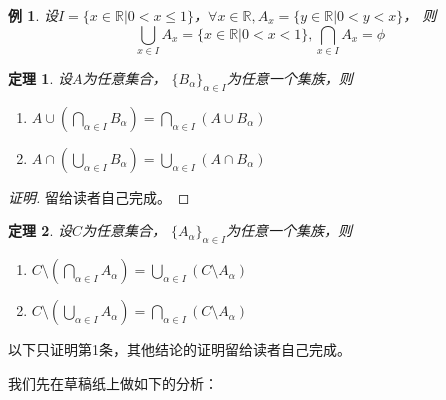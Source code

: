 \documentclass{book}[oneside]
\newtheorem{Thm}{定理}[chapter]
\newtheorem*{Example}{例}
\begin{document}
\begin{CJK*}{UTF8}{gbsn}
  \begin{Example}
    设$I=\{x \in \mathbb{R} | 0 < x \leq 1\}$，$\forall x \in \mathbb{R}, A_x=\{y\in \mathbb{R}|0 < y < x\}$，
    则
    \begin{equation*}
      \bigcup_{x\in I}A_x=\{x \in \mathbb{R} | 0 < x < 1\},
      \bigcap_{x\in I}A_x=\phi      
    \end{equation*}
  \end{Example}

  \begin{Thm}
设$A$为任意集合， $\{B_{\alpha}\}_{\alpha \in I}$为任意一个集族，则
\begin{enumerate}
  \item $A \cup (\bigcap_{\alpha \in I}B_{\alpha}) = \bigcap_{\alpha \in I}(A \cup B_{\alpha})$
  \item $A \cap (\bigcup_{\alpha \in I}B_{\alpha}) = \bigcup_{\alpha \in I}(A \cap B_{\alpha})$
\end{enumerate}
\end{Thm}
\begin{proof}[证明]
  留给读者自己完成。
\end{proof}
\begin{Thm}
  设$C$为任意集合， $\{A_{\alpha}\}_{\alpha \in I}$为任意一个集族，则
  \begin{enumerate}
  \item $C\setminus(\bigcap_{\alpha \in I}A_{\alpha})=\bigcup_{\alpha\in I}(C\setminus A_{\alpha})$
  \item $C\setminus(\bigcup_{\alpha \in I}A_{\alpha})=\bigcap_{\alpha\in I}(C\setminus A_{\alpha})$
  \end{enumerate}
  \end{Thm}
  以下只证明第1条，其他结论的证明留给读者自己完成。

  我们先在草稿纸上做如下的分析：


\end{CJK*}
\end{document}
